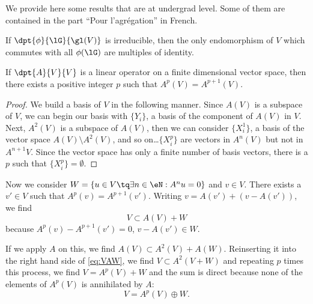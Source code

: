 
We provide here some results that are at undergrad level. Some of them are contained in the part ``Pour l'agrégation'' in French.

\begin{lemma} \label{lem:Schur}
If $\dpt{\phi}{\lG}{\gl(V)}$ is irreducible, then the only endomorphism of $V$ which commutes with all $\phi(\lG)$ are multiples of identity.
\end{lemma}

\begin{lemma} \label{lem:A_n_stabilise}
    If $\dpt{A}{V}{V}$ is a linear operator on a finite dimensional vector space, then there exists a positive integer $p$ such that $A^p(V)=A^{p+1}(V)$.
\end{lemma}

\begin{proof}
We build a basis of $V$ in the following manner. Since $A(V)$ is a subspace of $V$, we can begin our basis with $\{Y_i\}$, a basis of the component of $A(V)$ in $V$. Next, $A^2(V)$ is a subspace of $A(V)$, then we can consider $\{X^1_i\}$, a basis of the vector space $A(V)\setminus A^2(V)$, and so on\ldots $\{X^p_i\}$ are vectors in $A^n(V)$ but not in $A^{n+1}V$. Since the vector space has only a finite number of basis vectors, there is a $p$ such that $\{X^p_i\}=\emptyset$.
\end{proof}

Now we consider $W=\{u\in V\tq\exists n\in\eN:A^nu=0\}$ and $v\in V$. There exists a $v'\in V$ such that $A^p(v)=A^{p+1}(v')$. Writing  $v= A(v')+(v-A(v'))$, we find
\begin{equation}\label{eq:VAW}
V\subset A(V)+W
\end{equation}
because $A^p(v)-A^{p+1}(v')=0$, $v-A(v')\in W$.

If we apply $A$ on this, we find $A(V)\subset A^2(V)+A(W)$. Reinserting it into the right hand side of \eqref{eq:VAW}, we find $V\subset A^2(V+W)$ and repeating $p$ times this process, we find $V=A^p(V)+W$ and the sum is direct because none of the elements of $A^p(V)$ is annihilated by $A$:
\begin{equation}\label{eq:ApoplusW}
V=A^p(V)\oplus W.
\end{equation}

